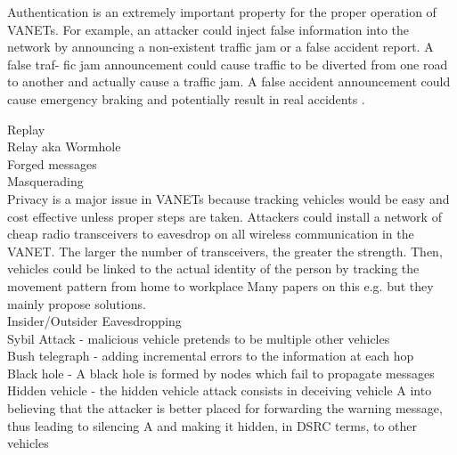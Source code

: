 
Authentication is an extremely important property for the proper operation of VANETs. For example, an attacker could
inject false information into the network by announcing a non-existent traffic jam or a false accident report. A false traf- fic jam announcement could cause traffic to be diverted from one road to another and actually cause a traffic jam. A false accident announcement could cause emergency braking and potentially result in real accidents \cite{toor2008vehicle}.


Replay\\
Relay aka Wormhole \cite{raya2007securing} \\
Forged messages\\
Masquerading \cite{laurendeau2006threats}\\

Privacy is a major issue in VANETs because tracking vehicles would be easy and cost effective unless proper steps are taken. Attackers could install a network of cheap radio transceivers to eavesdrop on all wireless communication in the VANET. The larger the number of transceivers, the greater the strength. Then, vehicles could be linked to the actual identity of the person by tracking the movement pattern from home to workplace \cite{toor2008vehicle}
Many papers on this e.g. \cite{dotzer2006privacy} but they mainly propose solutions.\\


Insider/Outsider Eavesdropping \cite{laurendeau2006threats}\\


Sybil Attack - malicious vehicle pretends to be multiple other vehicles \cite{zhou2007privacy}\\

Bush telegraph - adding incremental errors to the information at each hop\cite{raya2007securing}\\



Black hole -  A black hole is formed by nodes which fail to propagate messages \cite{laurendeau2006threats} \\


Hidden vehicle - the hidden vehicle attack consists in deceiving vehicle A into believing that the attacker is better placed for forwarding the warning message, thus leading to silencing A and making it hidden, in DSRC terms, to other vehicles \cite{raya2007securing}\\